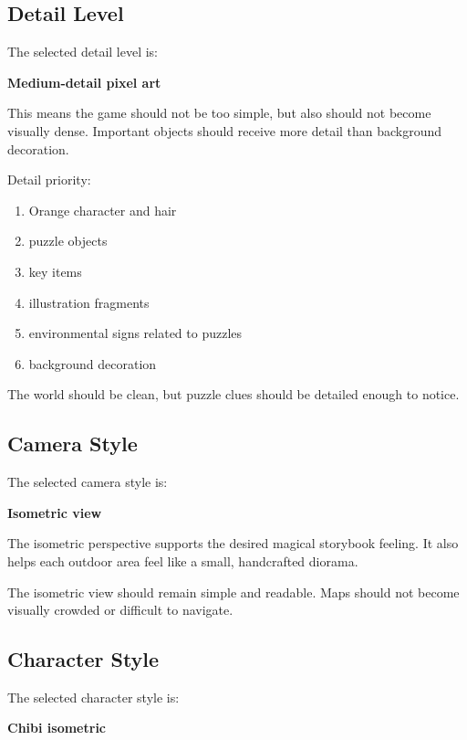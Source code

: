 \documentclass[12pt]{article}
\begin{document}
\subsection{Detail Level}

The selected detail level is:

\begin{center}
\textbf{Medium-detail pixel art}
\end{center}

This means the game should not be too simple, but also should not become visually dense. Important objects should receive more detail than background decoration.

Detail priority:

\begin{enumerate}[leftmargin=*]
    \item Orange character and hair
    \item puzzle objects
    \item key items
    \item illustration fragments
    \item environmental signs related to puzzles
    \item background decoration
\end{enumerate}

The world should be clean, but puzzle clues should be detailed enough to notice.

\subsection{Camera Style}

The selected camera style is:

\begin{center}
\textbf{Isometric view}
\end{center}

The isometric perspective supports the desired magical storybook feeling. It also helps each outdoor area feel like a small, handcrafted diorama.

The isometric view should remain simple and readable. Maps should not become visually crowded or difficult to navigate.

\subsection{Character Style}

The selected character style is:

\begin{center}
\textbf{Chibi isometric}
\end{center}
\end{document}
